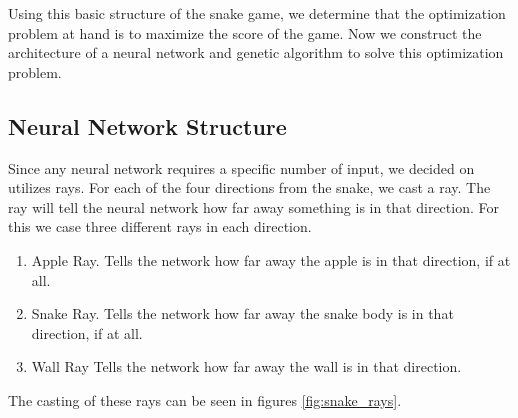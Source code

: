 \documentclass{amsart}
\begin{document}
Using this basic structure of the snake game, we determine that the
optimization problem at hand is to maximize the score of the game. Now we
construct the architecture of a neural network and genetic algorithm to solve
this optimization problem.

\subsection{Neural Network Structure}

Since any neural network requires a specific number of input, we decided on
utilizes rays. For each of the four directions from the snake, we cast a ray.
The ray will tell the neural network how far away something is in that
direction. For this we case three different rays in each direction.
\begin{enumerate}
  \item Apple Ray. Tells the network how far away the apple is in that
    direction, if at all.
  \item Snake Ray. Tells the network how far away the snake body is in that
    direction, if at all.
  \item Wall Ray Tells the network how far away the wall is in that direction.
\end{enumerate}
The casting of these rays can be seen in figures \ref{fig:snake_rays}.
\end{document}
